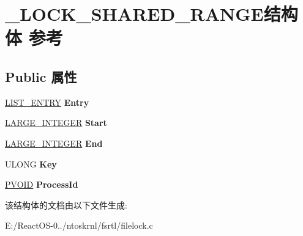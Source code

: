 \hypertarget{struct___l_o_c_k___s_h_a_r_e_d___r_a_n_g_e}{}\section{\+\_\+\+L\+O\+C\+K\+\_\+\+S\+H\+A\+R\+E\+D\+\_\+\+R\+A\+N\+G\+E结构体 参考}
\label{struct___l_o_c_k___s_h_a_r_e_d___r_a_n_g_e}
\subsection*{Public 属性}
\begin{DoxyCompactItemize}
\item 
\mbox{\label{struct___l_o_c_k___s_h_a_r_e_d___r_a_n_g_e_ab11e36184d665431ec0adcb13e7b5b77}} 
\hyperlink{struct___l_i_s_t___e_n_t_r_y}{L\+I\+S\+T\+\_\+\+E\+N\+T\+RY} {\bfseries Entry}
\item 
\mbox{\label{struct___l_o_c_k___s_h_a_r_e_d___r_a_n_g_e_a52f2d5fb4f4ffffdd8cdfb4aed1381e2}} 
\hyperlink{union___l_a_r_g_e___i_n_t_e_g_e_r}{L\+A\+R\+G\+E\+\_\+\+I\+N\+T\+E\+G\+ER} {\bfseries Start}
\item 
\mbox{\label{struct___l_o_c_k___s_h_a_r_e_d___r_a_n_g_e_a0687aaf5e7a8b02d15c69c516b312691}} 
\hyperlink{union___l_a_r_g_e___i_n_t_e_g_e_r}{L\+A\+R\+G\+E\+\_\+\+I\+N\+T\+E\+G\+ER} {\bfseries End}
\item 
\mbox{\label{struct___l_o_c_k___s_h_a_r_e_d___r_a_n_g_e_aee7be88f6db8410370759cb1cd3f5338}} 
U\+L\+O\+NG {\bfseries Key}
\item 
\mbox{\label{struct___l_o_c_k___s_h_a_r_e_d___r_a_n_g_e_adee8c1101b141fe20e200e97d6bbee61}} 
\hyperlink{interfacevoid}{P\+V\+O\+ID} {\bfseries Process\+Id}
\end{DoxyCompactItemize}


该结构体的文档由以下文件生成\+:\begin{DoxyCompactItemize}
\item 
E\+:/\+React\+O\+S-\/0../ntoskrnl/fsrtl/filelock.\+c\end{DoxyCompactItemize}

